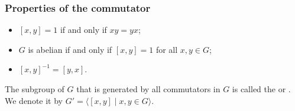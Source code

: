 \subsubsection{Properties of the commutator}
\begin{itemize}
	\item $[x, y] = 1$ if and only if $xy = yx$;
	\item $G$ is abelian if and only if $[x, y] = 1$ for all $x, y \in G$;
	\item $[x, y]^{-1} = [y, x]$.
\end{itemize}

\begin{definition}
	The subgroup of $G$ that is generated by all commutators in $G$ is called the  or . We denote it by $G' = \langle [x, y] \mid x, y \in G \rangle$.
\end{definition}

